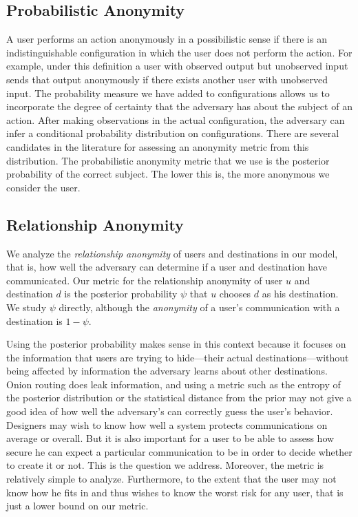 \documentclass[prodmode,acmtissec]{acmsmall}
\begin{document}
\subsection{Probabilistic Anonymity}
A user performs an action anonymously in a possibilistic sense if there is an indistinguishable configuration in which the user does not perform the action.  For example, under this definition a user with observed output but unobserved input sends that output anonymously if there exists another user with unobserved input.  The probability measure we have added to configurations allows us to incorporate the degree of certainty that the adversary has about the subject of an action.  After making observations in the actual configuration, the adversary can infer a conditional probability distribution on configurations.  There are several candidates in the literature for assessing an anonymity metric from this distribution.  The probabilistic anonymity metric that we use is the posterior probability of the correct subject.  The lower this is, the more anonymous we consider the user.

\subsection{Relationship Anonymity}
We analyze the \emph{relationship anonymity} of users and destinations in our model, that is, how well the adversary can determine if a user and destination have communicated.  Our metric for the relationship anonymi\-ty of user $u$ and destination $d$ is the posterior probability $\psi$ that $u$ chooses $d$ as his destination.  We study $\psi$ directly, although the \emph{anonymity} of a user's communication with a destination is $1-\psi$.

Using the posterior probability makes sense in this context because it
focuses on the information that users are trying to hide---their
actual destinations---without being affected by information the
adversary learns about other destinations.  Onion routing does leak
information, and using a metric such as the entropy of the posterior
distribution or the statistical distance from the prior may not give a
good idea of how well the adversary's can correctly guess the user's
behavior.  Designers may wish to know how well a system protects
communications on average or overall. But it is also important for a
user to be able to assess how secure he can expect a particular
communication to be in order to decide whether to create it or
not. This is the question we address. Moreover, the metric is
relatively simple to analyze. Furthermore, to the extent that the user
may not know how he fits in and thus wishes to know the worst risk for
any user, that is just a lower bound on our metric.
\end{document}
